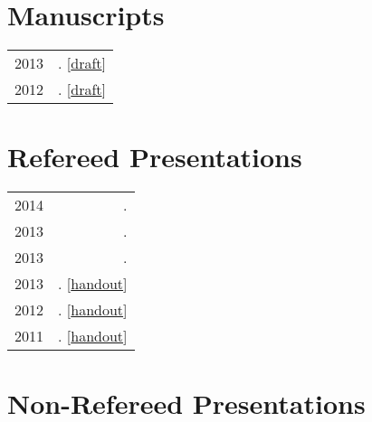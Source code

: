 \documentclass[letterpaper]{article}
\makeatletter
\newcommand{\myvrule}{\color{lightgray}\vrule width 1.0pt}
\newenvironment{cvsection}{%
  \renewcommand{\arraystretch}{1.75}
  \begin{longtable}[l]{@{} L R @{}}
}{%
  \end{longtable}
}
\makeatother
\begin{document}
\section*{Manuscripts}

\begin{cvsection}
  2013 & \null{}.
  [\href{http://people.linguistics.mcgill.ca/~brian.buccola/files/buccola2013-eval2.pdf}{draft}] \\

  2012 & \null{}.
  [\href{http://people.linguistics.mcgill.ca/~brian.buccola/files/buccola2012-eval1.pdf}{draft}] \\
\end{cvsection}



\section*{Refereed Presentations}

\begin{cvsection}
  2014 & \null{}. \\
  2013 & \null{}. \\
  2013 & \null{}. \\
  2013 & \null{}.
  [\href{http://people.linguistics.mcgill.ca/~brian.buccola/files/buccola2013-mot.pdf}{handout}] \\

  2012 & \null{}.
  [\href{http://people.linguistics.mcgill.ca/~brian.buccola/files/buccola2012-tom5.pdf}{handout}] \\

  2011 & \null{}.
  [\href{http://people.linguistics.mcgill.ca/~brian.buccola/files/buccola2011-tom4.pdf}{handout}] \\
\end{cvsection}



\section*{Non-Refereed Presentations}
\end{document}
